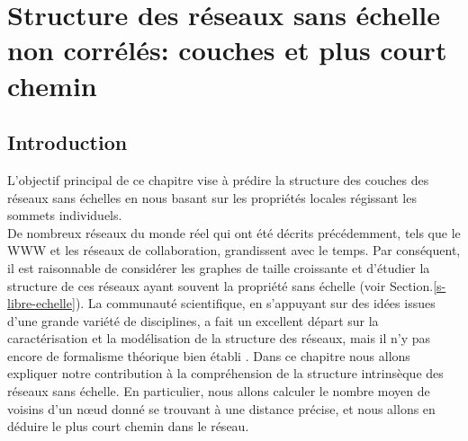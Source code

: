 \newcommand{\km}{\textless k \textgreater}
\chapter{Structure des réseaux sans échelle non corrélés: couches et plus court chemin}
\label{sec3}
\begin{minipage}{\textwidth}
	\linespread{1.2}
	\minitoc
\end{minipage}

\section{Introduction}
L'objectif principal de ce chapitre vise à prédire la structure des couches
des réseaux sans échelles en nous basant sur les propriétés locales régissant les sommets individuels.\\
De nombreux réseaux du monde réel qui ont été décrits précédemment, tels que le WWW et les réseaux de collaboration, grandissent avec le temps. Par conséquent, il est raisonnable de considérer les graphes de taille croissante et d'étudier la structure de ces réseaux ayant souvent la propriété sans échelle (voir Section.\ref{s-libre-echelle}). 
La communauté scientifique, en s'appuyant sur des idées issues d'une grande variété de disciplines, a fait un excellent départ sur la caractérisation et la modélisation de la structure des réseaux, mais il n'y pas encore de formalisme théorique bien établi \cite{Ne2003}. Dans ce chapitre nous allons expliquer notre contribution à la compréhension de la structure intrinsèque des réseaux sans échelle. En particulier, nous allons calculer le nombre moyen de voisins d'un nœud  donné se trouvant à une distance précise, et nous allons en déduire le plus court chemin dans le réseau.%
